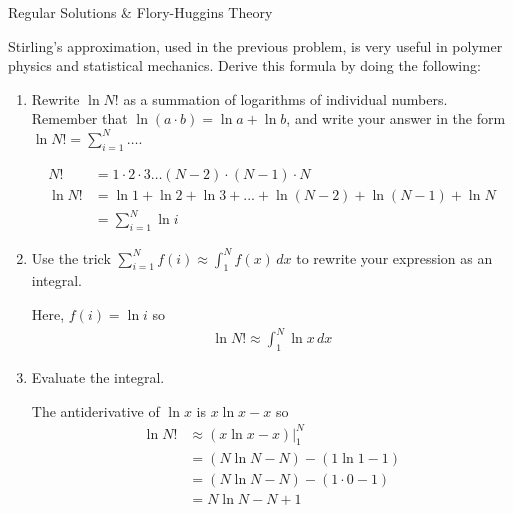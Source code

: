 \begin{activity}{Regular Solutions \& Flory-Huggins Theory}
\begin{exercises}
\begin{enumerate}
\begin{solution}{}
					\end{solution}
					
			\end{enumerate}



		\exercise Stirling's approximation, used in the previous problem, is very useful in polymer physics and statistical mechanics.  Derive this formula by doing the following:
			\begin{enumerate}
				\item Rewrite $\ln N!$ as a summation of logarithms of individual numbers.  Remember that $\ln (a\cdot b) = \ln a + \ln b$, and write your answer in the form $\ln N! = \sum_{i=1}^N \dots$.
				
					\begin{solution}{}
						\begin{align*}
							N! &= 1\cdot 2 \cdot 3 \dots (N-2) \cdot (N-1) \cdot N \\
							\ln N! &= \ln 1 + \ln 2 + \ln 3 + ... + \ln(N-2) + \ln(N-1) + \ln N\\
							&= \sum_{i=1}^N \ln i
						\end{align*}
					\end{solution}
					
				\item Use the trick $\sum_{i=1}^{N} f(i) \approx \int_1^N f(x)\,dx$ to rewrite your expression as an integral.
				
					\begin{solution}{}
						Here, $f(i) = \ln i$ so
						\begin{align*}
							\ln N! \approx \int_1^N \ln x\,dx 
						\end{align*}
					\end{solution}
					
				\item Evaluate the integral.
				
					\begin{solution}{}
						The antiderivative of $\ln x$ is $x \ln x - x$ so
						\begin{align*}
							\ln N! &\approx (x \ln x - x)|_1^N \\
								&= (N \ln N - N) - (1 \ln 1 - 1) \\
								&= (N \ln N - N) - (1 \cdot 0 - 1) \\
								&= N \ln N - N + 1
						\end{align*}
					\end{solution}
					

\end{enumerate}
\end{exercises}
\end{activity}
